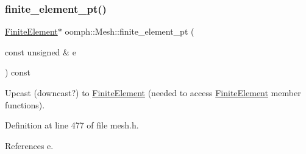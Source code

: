 \subsubsection{\texorpdfstring{finite\+\_\+element\+\_\+pt()}{finite\_element\_pt()}}
{\footnotesize\ttfamily \hyperlink{classoomph_1_1FiniteElement}{Finite\+Element}$\ast$ oomph\+::\+Mesh\+::finite\+\_\+element\+\_\+pt (\begin{DoxyParamCaption}\item[{const unsigned \&}]{e }\end{DoxyParamCaption}) const\hspace{0.3cm}{\ttfamily [inline]}}



Upcast (downcast?) to \hyperlink{classoomph_1_1FiniteElement}{Finite\+Element} (needed to access \hyperlink{classoomph_1_1FiniteElement}{Finite\+Element} member functions). 



Definition at line 477 of file mesh.\+h.



References e.



